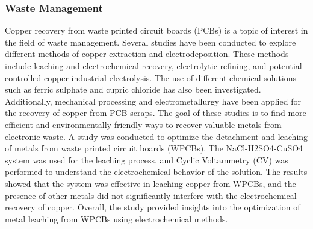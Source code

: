 \documentclass[../report.tex]{subfiles}
\begin{document}
\subsubsection{Waste Management}
Copper recovery from waste printed circuit boards (PCBs) is a topic of interest in the field of waste management. Several studies have been conducted to explore different methods of copper extraction and electrodeposition. These methods include leaching and electrochemical recovery, electrolytic refining, and potential-controlled copper industrial electrolysis. The use of different chemical solutions such as ferric sulphate and cupric chloride has also been investigated. Additionally, mechanical processing and electrometallurgy have been applied for the recovery of copper from PCB scraps. The goal of these studies is to find more efficient and environmentally friendly ways to recover valuable metals from electronic waste.
A study was conducted \cite{copper_recovery}  to optimize the detachment and leaching of metals from waste printed circuit boards (WPCBs). The NaCl-H2SO4-CuSO4 system was used for the leaching process, and Cyclic Voltammetry (CV) was performed to understand the electrochemical behavior of the solution. The results showed that the system was effective in leaching copper from WPCBs, and the presence of other metals did not significantly interfere with the electrochemical recovery of copper. Overall, the study provided insights into the optimization of metal leaching from WPCBs using electrochemical methods. 
\end{document}
